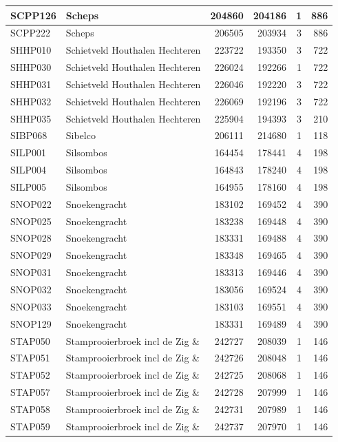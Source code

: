 \documentclass[11pt,]{book}
\begin{document}
\begin{table}
\begin{tabular}[t]{l|l|r|r|r|r}
\hline
SCPP126 & Scheps & 204860 & 204186 & 1 & 886\\
\hline
SCPP222 & Scheps & 206505 & 203934 & 3 & 886\\
\hline
SHHP010 & Schietveld Houthalen Hechteren & 223722 & 193350 & 3 & 722\\
\hline
SHHP030 & Schietveld Houthalen Hechteren & 226024 & 192266 & 1 & 722\\
\hline
SHHP031 & Schietveld Houthalen Hechteren & 226046 & 192220 & 3 & 722\\
\hline
SHHP032 & Schietveld Houthalen Hechteren & 226069 & 192196 & 3 & 722\\
\hline
SHHP035 & Schietveld Houthalen Hechteren & 225904 & 194393 & 3 & 210\\
\hline
SIBP068 & Sibelco & 206111 & 214680 & 1 & 118\\
\hline
SILP001 & Silsombos & 164454 & 178441 & 4 & 198\\
\hline
SILP004 & Silsombos & 164843 & 178240 & 4 & 198\\
\hline
SILP005 & Silsombos & 164955 & 178160 & 4 & 198\\
\hline
SNOP022 & Snoekengracht & 183102 & 169452 & 4 & 390\\
\hline
SNOP025 & Snoekengracht & 183238 & 169448 & 4 & 390\\
\hline
SNOP028 & Snoekengracht & 183331 & 169488 & 4 & 390\\
\hline
SNOP029 & Snoekengracht & 183348 & 169465 & 4 & 390\\
\hline
SNOP031 & Snoekengracht & 183313 & 169446 & 4 & 390\\
\hline
SNOP032 & Snoekengracht & 183056 & 169524 & 4 & 390\\
\hline
SNOP033 & Snoekengracht & 183103 & 169551 & 4 & 390\\
\hline
SNOP129 & Snoekengracht & 183331 & 169489 & 4 & 390\\
\hline
STAP050 & Stamprooierbroek incl de Zig \& & 242727 & 208039 & 1 & 146\\
\hline
STAP051 & Stamprooierbroek incl de Zig \& & 242726 & 208048 & 1 & 146\\
\hline
STAP052 & Stamprooierbroek incl de Zig \& & 242725 & 208068 & 1 & 146\\
\hline
STAP057 & Stamprooierbroek incl de Zig \& & 242728 & 207999 & 1 & 146\\
\hline
STAP058 & Stamprooierbroek incl de Zig \& & 242731 & 207989 & 1 & 146\\
\hline
STAP059 & Stamprooierbroek incl de Zig \& & 242737 & 207970 & 1 & 146\\

\end{tabular}
\end{table}
\end{document}
